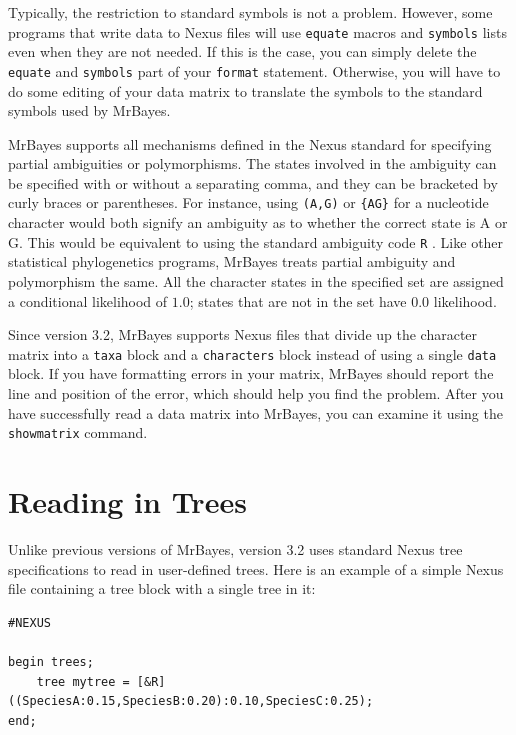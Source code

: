 \documentclass[12pt]{book}
\newcommand{\ttt}[1]{\texttt{#1} }
\begin{document}
Typically, the restriction to standard symbols is not a problem. However, some programs that write data to
Nexus files will use \ttt{equate} macros and \ttt{symbols} lists even when they are not needed. If this is the
case, you can simply delete the \ttt{equate} and \ttt{symbols} part of your \ttt{format} statement. Otherwise,
you will have to do some editing of your data matrix to translate the symbols to the standard symbols used
by MrBayes.

MrBayes supports all mechanisms defined in the Nexus standard for specifying partial ambiguities or
polymorphisms. The states involved in the ambiguity can be specified with or without a separating comma,
and they can be bracketed by curly braces or parentheses. For instance, using \ttt{(A,G)} or \ttt{\{AG\}} for a
nucleotide character would both signify an ambiguity as to whether the correct state is A or G. This would
be equivalent to using the standard ambiguity code \ttt{R}. Like other statistical phylogenetics programs,
MrBayes treats partial ambiguity and polymorphism the same. All the character states in the specified set
are assigned a conditional likelihood of $1.0$; states that are not in the set have $0.0$ likelihood.

Since version 3.2, MrBayes supports Nexus files that divide up the character matrix into a \ttt{taxa} block
and a \ttt{characters} block instead of using a single \ttt{data} block. If you have formatting errors in your
matrix, MrBayes should report the line and position of the error, which should help you find the problem.
After you have successfully read a data matrix into MrBayes, you can examine it using the \ttt{showmatrix}
command.

\section{Reading in Trees}
Unlike previous versions of MrBayes, version 3.2 uses standard Nexus tree specifications to read in
user-defined trees. Here is an example of a simple Nexus file containing a tree block with a
single tree in it:

\footnotesize
\begin{singlespacing}
\begin{verbatim}
#NEXUS

begin trees;
    tree mytree = [&R] ((SpeciesA:0.15,SpeciesB:0.20):0.10,SpeciesC:0.25);
end;
\end{verbatim}
\end{singlespacing}
\normalsize
\end{document}
